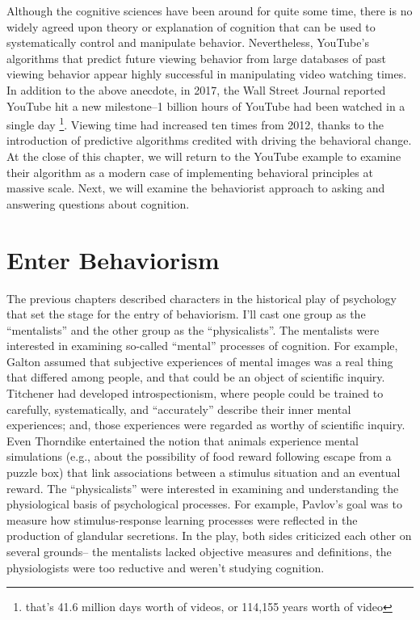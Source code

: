 \documentclass[
  oneside,
  12pt]{crumpbook}
\begin{document}
Although the cognitive sciences have been around for quite some time, there is no widely agreed upon theory or explanation of cognition that can be used to systematically control and manipulate behavior. Nevertheless, YouTube's algorithms that predict future viewing behavior from large databases of past viewing behavior appear highly successful in manipulating video watching times. In addition to the above anecdote, in 2017, the Wall Street Journal reported YouTube hit a new milestone--1 billion hours of YouTube had been watched in a single day \footnote{that's 41.6 million days worth of videos, or 114,155 years worth of video}. Viewing time had increased ten times from 2012, thanks to the introduction of predictive algorithms credited with driving the behavioral change. At the close of this chapter, we will return to the YouTube example to examine their algorithm as a modern case of implementing behavioral principles at massive scale. Next, we will examine the behaviorist approach to asking and answering questions about cognition.

\hypertarget{enter-behaviorism}{%
\section{Enter Behaviorism}\label{enter-behaviorism}}

The previous chapters described characters in the historical play of psychology that set the stage for the entry of behaviorism. I'll cast one group as the ``mentalists'' and the other group as the ``physicalists''. The mentalists were interested in examining so-called ``mental'' processes of cognition. For example, Galton assumed that subjective experiences of mental images was a real thing that differed among people, and that could be an object of scientific inquiry. Titchener had developed introspectionism, where people could be trained to carefully, systematically, and ``accurately'' describe their inner mental experiences; and, those experiences were regarded as worthy of scientific inquiry. Even Thorndike entertained the notion that animals experience mental simulations (e.g., about the possibility of food reward following escape from a puzzle box) that link associations between a stimulus situation and an eventual reward. The ``physicalists'' were interested in examining and understanding the physiological basis of psychological processes. For example, Pavlov's goal was to measure how stimulus-response learning processes were reflected in the production of glandular secretions. In the play, both sides criticized each other on several grounds-- the mentalists lacked objective measures and definitions, the physiologists were too reductive and weren't studying cognition.
\end{document}
